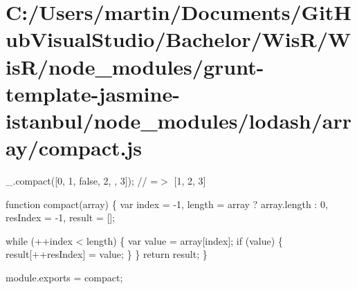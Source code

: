 \hypertarget{_c_1_2_users_2martin_2_documents_2_git_hub_visual_studio_2_bachelor_2_wis_r_2_wis_r_2node_module61f985b6a058cd1c408a9e70ada180a6}{}\section{C\+:/\+Users/martin/\+Documents/\+Git\+Hub\+Visual\+Studio/\+Bachelor/\+Wis\+R/\+Wis\+R/node\+\_\+modules/grunt-\/template-\/jasmine-\/istanbul/node\+\_\+modules/lodash/array/compact.\+js}
\+\_\+.\+compact(\mbox{[}0, 1, false, 2, \textquotesingle{}\textquotesingle{}, 3\mbox{]}); // =$>$ \mbox{[}1, 2, 3\mbox{]}


\begin{DoxyCodeInclude}

\textcolor{keyword}{function} compact(array) \{
  var index = -1,
      length = array ? array.length : 0,
      resIndex = -1,
      result = [];

  \textcolor{keywordflow}{while} (++index < length) \{
    var value = array[index];
    \textcolor{keywordflow}{if} (value) \{
      result[++resIndex] = value;
    \}
  \}
  \textcolor{keywordflow}{return} result;
\}

module.exports = compact;
\end{DoxyCodeInclude}
 